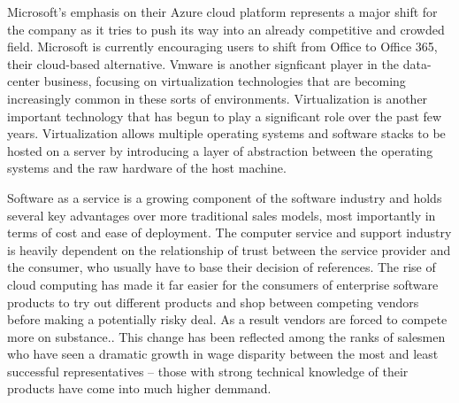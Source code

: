 Microsoft's emphasis on their Azure cloud platform represents a major shift for the company as it tries to push its way into an already competitive and crowded field.\autocite[]{OptimismInnovation}
Microsoft is currently encouraging users to shift from Office  to Office 365, their cloud-based alternative.\autocite[]{NextGenBusinessSoftware}
Vmware is another signficant player in the data-center business, focusing on virtualization technologies that are becoming increasingly common in these sorts of environments.\autocite[]{NextGenBusinessSoftware}
Virtualization is another important technology that has begun to play a significant role over the past few years.\autocite[]{LargeParadigmShiftCloudComputing}
Virtualization allows multiple operating systems and software stacks to be hosted on a server by introducing a layer of abstraction between the operating systems and the raw hardware of the host machine.\autocite[]{LargeParadigmShiftCloudComputing}

Software as a service is a growing component of the software industry and holds several key advantages over more traditional sales models, most importantly in terms of cost and ease of deployment.\autocite[]{GrowthTrendsSoftwareService}\autocite[]{TransitionPhaseEnterpriseApplication}
The computer service and support industry is heavily dependent on the relationship of trust between the service provider and the consumer, who usually have to base their decision of references.\autocite[9]{buxmann2012software}
The rise of cloud computing has made it far easier for the consumers of enterprise software products to try out different products and shop between competing vendors before making a potentially risky deal.\autocite[29]{LiquidLunch}
As a result vendors are forced to compete more on substance.\autocite[29]{LiquidLunch}.
This change has been reflected among the ranks of salesmen who have seen a dramatic growth in wage disparity between the most and least successful representatives -- those with strong technical knowledge of their products have come into much higher demmand.\autocite[30]{LiquidLunch}


